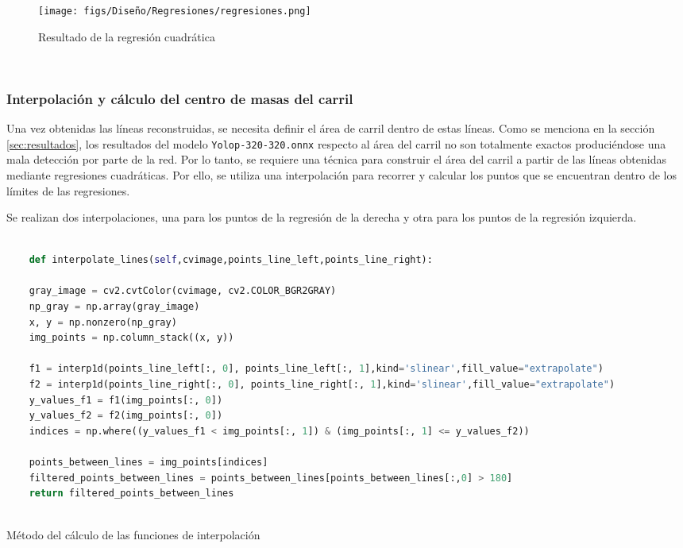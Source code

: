 \begin{figure} [H]
  \begin{center}
    \texttt{[image: figs/Diseño/Regresiones/regresiones.png]}
  \end{center}
  \caption{Resultado de la regresión cuadrática}
  \label{fig:regresión cuadrática}
\end{figure}\

\subsubsection{Interpolación y cálculo del centro de masas del carril}
\label{sec:Interpolación y cálculo del centro de masas del carril}

Una vez obtenidas las líneas reconstruidas, se necesita definir el área de carril dentro de estas líneas. Como se menciona en la sección 
\ref{sec:resultados}, los resultados del modelo \texttt{Yolop-320-320.onnx} respecto al área del carril no son totalmente exactos produciéndose una mala detección por parte de la red. Por lo tanto, se requiere
una técnica para construir el área del carril a partir de las líneas obtenidas mediante regresiones cuadráticas. Por ello, se utiliza una interpolación para recorrer y calcular los puntos que se encuentran
dentro de los límites de las regresiones. \newline



Se realizan dos interpolaciones, una para 
los puntos de la regresión de la  derecha
y otra para los puntos de la regresión izquierda. 


\begin{code}[h]
  \begin{lstlisting}[language=Python]

    def interpolate_lines(self,cvimage,points_line_left,points_line_right):

    gray_image = cv2.cvtColor(cvimage, cv2.COLOR_BGR2GRAY) 
    np_gray = np.array(gray_image)
    x, y = np.nonzero(np_gray)
    img_points = np.column_stack((x, y))

    f1 = interp1d(points_line_left[:, 0], points_line_left[:, 1],kind='slinear',fill_value="extrapolate")
    f2 = interp1d(points_line_right[:, 0], points_line_right[:, 1],kind='slinear',fill_value="extrapolate") 
    y_values_f1 = f1(img_points[:, 0])
    y_values_f2 = f2(img_points[:, 0])
    indices = np.where((y_values_f1 < img_points[:, 1]) & (img_points[:, 1] <= y_values_f2))
    
    points_between_lines = img_points[indices]
    filtered_points_between_lines = points_between_lines[points_between_lines[:,0] > 180]
    return filtered_points_between_lines
    
  \end{lstlisting}
  \caption[Método de interpolación]{Método del cálculo de las funciones de interpolación}
  \label{cod:interpolación}
  \end{code}  

